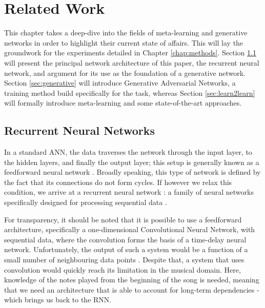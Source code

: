 \documentclass[a4paper]{book}
\begin{document}
\chapter{Related Work}\label{chap:theoretical_framework}

This chapter takes a deep-dive into the fields of meta-learning and generative networks in order to highlight their current state of affairs. This will lay the groundwork for the experiments detailed in Chapter \ref{chap:methods}. Section \ref{sec:rnn} will present the principal network architecture of this paper, the recurrent neural network, and argument for its use as the foundation of a generative network. Section \ref{sec:generative} will introduce Generative Adversarial Networks, a training method build specifically for the task, whereas Section \ref{sec:learn2learn} will formally introduce meta-learning and some state-of-the-art approaches. 

\section{Recurrent Neural Networks} \label{sec:rnn}

In a standard ANN, the data traverses the network through the input layer, to the hidden layers, and finally the output layer; this setup is generally known as a feedforward neural network \parencite[Figure \ref{fig:feedforward_net};][]{graves_supervised_2012}. Broadly speaking, this type of network is defined by the fact that its connections do not form cycles. If however we relax this condition, we arrive at a recurrent neural network \parencite[Figure \ref{fig:rnn_folded};][]{rumelhart_learning_1986}: a family of neural networks specifically designed for processing sequential data \parencite{goodfellow_deep_2016}.

For transparency, it should be noted that it is possible to use a feedforward architecture, specifically a one-dimensional Convolutional Neural Network, with sequential data, where the convolution forms the basis of a time-delay neural network. Unfortunately, the output of such a system would be a function of a small number of neighbouring data points \parencite[such as the last and the next three notes in a song;][]{goodfellow_deep_2016}. Despite that, a system that uses convolution would quickly reach its limitation in the musical domain. Here, knowledge of the notes played from the beginning of the song is needed, meaning that we need an architecture that is able to account for long-term dependencies - which brings us back to the RNN.
\end{document}
